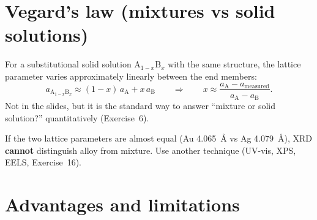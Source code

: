 \section{Vegard's law (mixtures vs solid solutions)\extra}
\label{sec:vegard}
For a substitutional solid solution A$_{1-x}$B$_x$ with the same structure, the lattice parameter varies approximately
linearly between the end members:
\begin{equation}
a_{\mathrm{A}_{1-x}\mathrm{B}_x} \approx (1-x)\,a_\mathrm{A} + x\,a_\mathrm{B}
\qquad\Rightarrow\qquad x \approx \frac{a_\mathrm{A} - a_\mathrm{measured}}{a_\mathrm{A}-a_\mathrm{B}}.
\end{equation}
Not in the slides, but it is the standard way to answer ``mixture or solid solution?'' quantitatively (Exercise~6).
\begin{pitfall}
If the two lattice parameters are almost equal (Au \SI{4.065}{\angstrom} vs Ag \SI{4.079}{\angstrom}), XRD \textbf{cannot}
distinguish alloy from mixture. Use another technique (UV-vis, XPS, EELS, Exercise~16).
\end{pitfall}

\section{Advantages and limitations}

